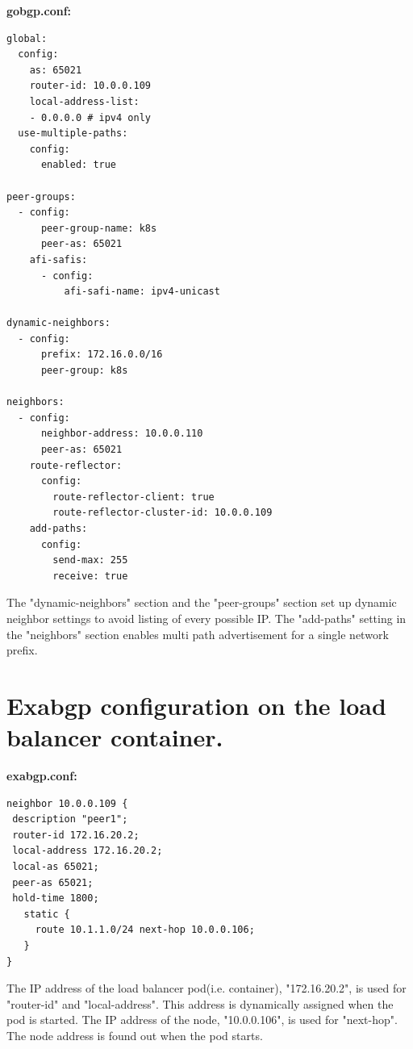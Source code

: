 {\bf\normalsize gobgp.conf:}
\begin{verbatim}
global:
  config:
    as: 65021
    router-id: 10.0.0.109
    local-address-list:
    - 0.0.0.0 # ipv4 only
  use-multiple-paths:
    config:
      enabled: true

peer-groups:
  - config:
      peer-group-name: k8s
      peer-as: 65021
    afi-safis:
      - config:
          afi-safi-name: ipv4-unicast

dynamic-neighbors:
  - config:
      prefix: 172.16.0.0/16
      peer-group: k8s

neighbors:
  - config:
      neighbor-address: 10.0.0.110
      peer-as: 65021
    route-reflector:
      config:
        route-reflector-client: true
        route-reflector-cluster-id: 10.0.0.109
    add-paths: 
      config:
        send-max: 255
        receive: true

\end{verbatim}

The "dynamic-neighbors" section and the "peer-groups" section set up dynamic neighbor settings to avoid listing of every possible IP. 
The "add-paths" setting in the "neighbors" section enables multi path advertisement for a single network prefix.

\section{Exabgp configuration on the load balancer container.}
\label{appendix:exabgp_config}

{\bf\normalsize exabgp.conf:}
\begin{verbatim}
neighbor 10.0.0.109 {
 description "peer1";
 router-id 172.16.20.2;
 local-address 172.16.20.2;
 local-as 65021;
 peer-as 65021;
 hold-time 1800;
   static {
     route 10.1.1.0/24 next-hop 10.0.0.106;
   }
}
\end{verbatim}

The IP address of the load balancer pod(i.e. container), "172.16.20.2", is used for "router-id" and "local-address".
This address is dynamically assigned when the pod is started.
The IP address of the node, "10.0.0.106", is used for "next-hop".
The node address is found out when the pod starts.

